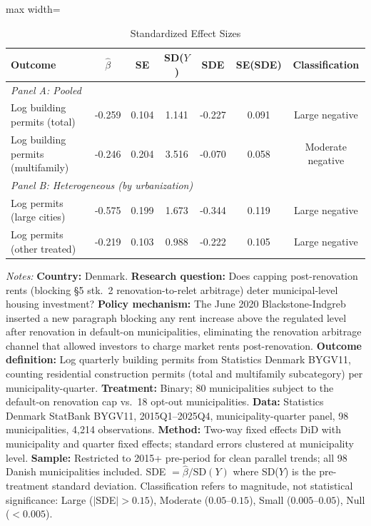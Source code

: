 \begin{table}[htbp]
\centering
\caption{Standardized Effect Sizes}
\label{tab:sde}
\begin{threeparttable}
\begin{adjustbox}{max width=\textwidth}
\begin{tabular}{lcccccc}
\hline\hline
Outcome & $\hat{\beta}$ & SE & SD($Y$) & SDE & SE(SDE) & Classification \\
\hline
\multicolumn{7}{l}{\textit{Panel A: Pooled}} \\
Log building permits (total) & -0.259 & 0.104 & 1.141 & -0.227 & 0.091 & Large negative \\
Log building permits (multifamily) & -0.246 & 0.204 & 3.516 & -0.070 & 0.058 & Moderate negative \\
\hline
\multicolumn{7}{l}{\textit{Panel B: Heterogeneous (by urbanization)}} \\
Log permits (large cities) & -0.575 & 0.199 & 1.673 & -0.344 & 0.119 & Large negative \\
Log permits (other treated) & -0.219 & 0.103 & 0.988 & -0.222 & 0.105 & Large negative \\
\hline\hline
\end{tabular}
\end{adjustbox}
\vspace{0.3em}
\begin{minipage}{\textwidth}
\footnotesize \textit{Notes:}
\textbf{Country:} Denmark.
\textbf{Research question:} Does capping post-renovation rents (blocking \S5 stk.\ 2 renovation-to-relet arbitrage) deter municipal-level housing investment?
\textbf{Policy mechanism:} The June 2020 Blackstone-Indgreb inserted a new paragraph blocking any rent increase above the regulated level after renovation in default-on municipalities, eliminating the renovation arbitrage channel that allowed investors to charge market rents post-renovation.
\textbf{Outcome definition:} Log quarterly building permits from Statistics Denmark BYGV11, counting residential construction permits (total and multifamily subcategory) per municipality-quarter.
\textbf{Treatment:} Binary; 80 municipalities subject to the default-on renovation cap vs.\ 18 opt-out municipalities.
\textbf{Data:} Statistics Denmark StatBank BYGV11, 2015Q1--2025Q4, municipality-quarter panel, 98 municipalities, 4,214 observations.
\textbf{Method:} Two-way fixed effects DiD with municipality and quarter fixed effects; standard errors clustered at municipality level.
\textbf{Sample:} Restricted to 2015+ pre-period for clean parallel trends; all 98 Danish municipalities included.
SDE $= \hat{\beta} / \text{SD}(Y)$ where SD($Y$) is the pre-treatment standard deviation.
Classification refers to magnitude, not statistical significance:
Large ($|$SDE$| > 0.15$), Moderate ($0.05$--$0.15$), Small ($0.005$--$0.05$), Null ($< 0.005$).
\end{minipage}
\end{threeparttable}
\end{table}

